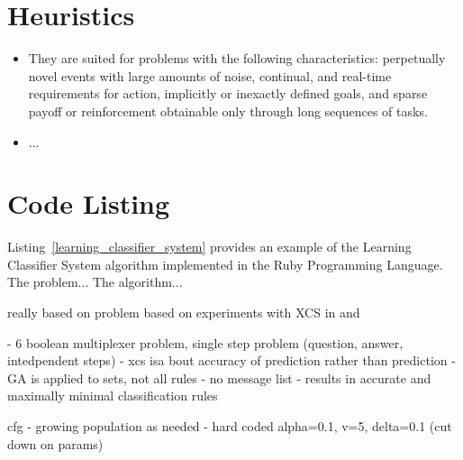 \documentclass[a4paper, 11pt]{article}
\begin{document}
\section{Heuristics}
\label{sec:heuristics}
\begin{itemize}
	\item They are suited for problems with the following characteristics: perpetually novel events with large amounts of noise, continual, and real-time requirements for action, implicitly or inexactly defined goals, and sparse payoff or reinforcement obtainable only through long sequences of tasks.
	\item ...
	
\end{itemize}

\section{Code Listing}
\label{sec:code}
Listing~\ref{learning_classifier_system} provides an example of the Learning Classifier System algorithm implemented in the Ruby Programming Language. 
The problem...
The algorithm...


really based on \cite{Butz2002a}
problem based on experiments with XCS in \cite{Wilson1995} and \cite{Wilson1998}

- 6 boolean multiplexer problem, single step problem (question, answer, intedpendent steps)
- xcs isa bout accuracy of prediction rather than prediction
- GA is applied to sets, not all rules
- no message list
- results in accurate and maximally minimal classification rules

cfg
- growing population as needed
- hard coded alpha=0.1, v=5, delta=0.1 (cut down on params)
\end{document}

